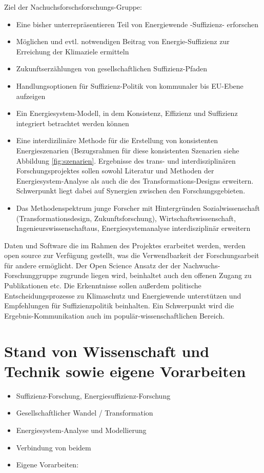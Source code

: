 \documentclass[a4paper,11pt,twoside]{scrartcl}
\begin{document}
Ziel der Nachuchsforschsforschungs-Gruppe:
\begin{itemize}
 \item Eine bisher unterrepräsentieren Teil von Energiewende -Suffizienz- erforschen
 \item Möglichen und evtl. notwendigen Beitrag von Energie-Suffizienz zur Erreichung der Klimaziele ermitteln
 \item Zukunftserzählungen von gesellschaftlichen Suffizienz-Pfaden
 \item Handlungsoptionen für Suffizienz-Politik von kommunaler bis EU-Ebene aufzeigen
 \item Ein Energiesystem-Modell, in dem Konsistenz, Effizienz und Suffizienz integriert betrachtet werden können
 \item Eine interdizilinäre Methode für die Erstellung von konsistenten Energieszenarien (Bezugsrahmen für diese konsistenten Szenarien siehe Abbildung \ref{fig:szenarien}. Ergebnisse des trans- und interdisziplinären Forschungsprojektes sollen sowohl Literatur und Methoden der Energiesystem-Analyse als auch die des Transformations-Designs erweitern. Schwerpunkt liegt dabei auf Synergien zwischen den Forschungsgebieten.
 \item Das Methodenspektrum junge Forscher mit Hintergründen Sozialwissenschaft (Transformationsdesign, Zukunftsforschung), Wirtschaftswissenschaft, Ingenieurswissenschaftaus, Energiesystemanalyse interdisziplinär erweitern
\end{itemize}

Daten und Software die im Rahmen des Projektes erarbeitet werden, werden open source zur Verfügung gestellt, was die Verwendbarkeit der Forschungsarbeit für andere ermöglicht. Der Open Science Ansatz der der Nachwuchs-Forschunggruppe zugrunde liegen wird, beinhaltet auch den offenen Zugang zu Publikationen etc. Die Erkenntnisse sollen außerdem politische Entscheidungsprozesse zu Klimaschutz und Energiewende unterstützen und Empfehlungen für Suffizienzpolitik beinhalten. Ein Schwerpunkt wird die Ergebnis-Kommunikation auch im populär-wissenschaftlichen Bereich.

\section{Stand von Wissenschaft und Technik sowie eigene Vorarbeiten}
\begin{itemize}
    \item Suffizienz-Forschung, Energiesuffizienz-Forschung
    \item Gesellschaftlicher Wandel / Transformation 
    \item Energiesystem-Analyse und Modellierung
    \item Verbindung von beidem
    \item Eigene Vorarbeiten: 
\end{itemize}
\end{document}
